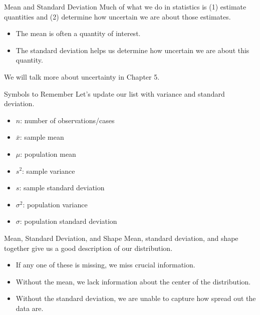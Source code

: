 \begin{frame}{Mean and Standard Deviation}
    Much of what we do in statistics is (1) estimate quantities and (2) determine how uncertain we are about those estimates. 
    \begin{itemize}
        \item The mean is often a quantity of interest.
        \item The standard deviation helps us determine how uncertain we are about this quantity.
    \end{itemize}
    
    \vspace{12pt}We will talk more about uncertainty in Chapter 5.
\end{frame}

\begin{frame}{Symbols to Remember}
    Let's update our list with variance and standard deviation.
    \begin{itemize}
        \item $n$: number of observations/cases
        \item $\bar{x}$: sample mean
        \item $\mu$: population mean
        \item $s^2$: sample variance
        \item $s$: sample standard deviation
        \item $\sigma^2$: population variance
        \item $\sigma$: population standard deviation
    \end{itemize}
\end{frame}

\begin{frame}{Mean, Standard Deviation, and Shape}
    Mean, standard deviation, and shape together give us a good description of our distribution. 
    \begin{itemize}
        \item If any one of these is missing, we miss crucial information.
        \item Without the mean, we lack information about the center of the distribution.
        \item Without the standard deviation, we are unable to capture how spread out the data are. 
    \end{itemize}
\end{frame}

